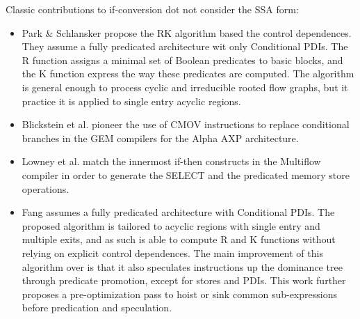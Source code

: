 
Classic contributions to if-conversion
dot not consider the SSA form: \begin{itemize}


\item Park \& Schlansker \cite{Park:1991:TR58} propose the RK algorithm based
the control dependences. They assume a fully predicated architecture wit only
Conditional PDIs. The R function assigns a minimal set of Boolean predicates to
basic blocks, and the K function express the way these predicates are computed.
The algorithm is general enough to process cyclic and irreducible rooted flow
graphs, but it practice it is applied to single entry acyclic regions.

\item Blickstein et al. \cite{Blickstein:1992:DTJ} pioneer the use of CMOV
instructions to replace conditional branches in the GEM compilers for the Alpha
AXP architecture.

\item Lowney et al. \cite{Lowney:1993:JS} match the innermost if-then constructs
in the Multiflow compiler in order to generate the SELECT and the predicated
memory store operations.

\item Fang \cite{Fang:1996:LCPC} assumes a fully predicated architecture with
Conditional PDIs. The proposed algorithm is tailored to acyclic regions with
single entry and multiple exits, and as such is able to compute R and K
functions without relying on explicit control dependences.  The main improvement
of this algorithm over \cite{Park:1991:TR58} is that it also speculates
instructions up the dominance tree through predicate promotion, except for
stores and PDIs. This work further proposes a pre-optimization pass to hoist or
sink common sub-expressions before predication and speculation.


\end{itemize}
